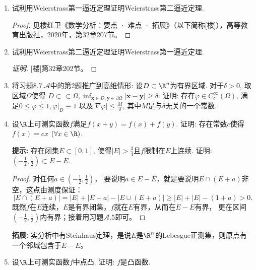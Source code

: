 \begin{quizb}
\begin{enumerate}
\item 试利用Weierstrass第一逼近定理证明Weierstrass第二逼近定理.
\begin{proof}
见楼红卫《数学分析：要点 · 难点 · 拓展》（以下简称[楼]），高等教育出版社，2020年，第32章207节。
\end{proof}

\item 试利用Weierstrass第二逼近定理证明Weierstrass第一逼近定理.
\begin{proof}[证明]
[楼]第32章202节。
\end{proof}

\item 将习题\(8.7.\boldsymbol{\mathcal{A}}\)中的第2题推广到高维情形: 
设\(D\subset\R^n\)为有界区域. 对于\(\delta>0\), 取区域\(\varOmega\)使得
\(D\subset\subset \varOmega,\inf_{\boldsymbol{x}\in D,\boldsymbol{y}\in\partial\varOmega}|\boldsymbol{x}-\boldsymbol{y}|\geqslant\delta\). 
证明: 存在\(\varphi\in C_c^{\infty}(\varOmega)\), 
满足\(0\leqslant\varphi\leqslant 1,\varphi\big|_D\equiv 1\)
以及\(|\nabla\varphi|\leqslant\frac{M}{\delta}\), 
其中\(M\)是与\(\delta\)无关的一个常数.

\item 设\(\R\)上可测实函数\(f\)满足\(f(x+y)=f(x)+f(y)\). 
证明: 存在常数\(c\)使得\(f(x)=cx\) \((\forall x\in\R)\).

\textbf{提示: }存在闭集\(E\subset [0,1]\), 
使得\(|E|>\frac{3}{4}\)且\(f\)限制在\(E\)上连续. 
证明: \(\left(-\frac{1}{2},\frac{1}{2}\right)\subset E-E\).
\begin{proof}
    对任何\(a\in\left(-\frac{1}{2},\frac{1}{2}\right)\)，
    要说明$a\in E-E$，就是要说明$E \cap (E+a)$非空，这点由测度保证：
    \[|E \cap (E+a)|=|E|+|E+a|-|E \cup (E+a)|\geqslant|E|+|E|-(1+a)>0.\]
    既然$f$在$E$连续，$E$是有界闭集，$f$就在$E$有界，从而在$E-E$有界，
    更在区间\(\left(-\frac{1}{2},\frac{1}{2}\right)\)内有界；接着用习题$\mathcal{A}.5$即可。
\end{proof}
\textbf{拓展: }实分析中有Steinhaus定理，是说$E$是$\R^n$的Lebesgue正测集，则原点有一个邻域包含于$E-E$。

\item 设\(\R\)上可测实函数\(f\)中点凸. 证明: \(f\)是凸函数.


\end{enumerate}
\end{quizb}
